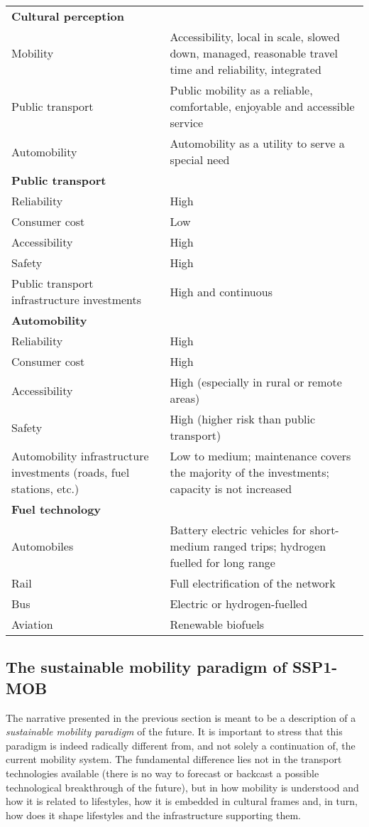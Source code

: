 \begin{table}
\begin{tabular}{p{5cm}p{9cm}}
\textbf{Cultural perception} &  \\
Mobility & Accessibility, local in scale, slowed down, managed, reasonable travel time and reliability, integrated \\
Public transport & Public mobility as a reliable, comfortable, enjoyable and accessible service \\
Automobility & Automobility as a utility to serve a special need \\\addlinespace
\textbf{Public transport} &  \\
Reliability & High \\
Consumer cost & Low \\
Accessibility & High \\
Safety & High \\
Public transport infrastructure investments & High and continuous \\\addlinespace
\textbf{Automobility} &  \\
Reliability & High \\
Consumer cost & High \\
Accessibility & High (especially in rural or remote areas) \\
Safety & High (higher risk than public transport) \\
Automobility infrastructure investments (roads, fuel stations, etc.) & Low to medium; maintenance covers the majority of the investments; capacity is not increased \\\addlinespace
\textbf{Fuel technology} &  \\
Automobiles & Battery electric vehicles for short-medium ranged trips; hydrogen fuelled for long range \\
Rail & Full electrification of the network \\
Bus & Electric or hydrogen-fuelled \\
Aviation & Renewable biofuels \\ \bottomrule
\end{tabular}
\end{table}

\subsection{The sustainable mobility paradigm of SSP1-MOB}
\label{ss:results:ssp1-mob-paradigm}
The narrative presented in the previous section is meant to be a description of a \emph{sustainable mobility paradigm} of the future. It is important to stress that this paradigm is indeed radically different from, and not solely a continuation of, the current mobility system. The fundamental difference lies not in the transport technologies available (there is no way to forecast or backcast a possible technological breakthrough of the future), but in how mobility is understood and how it is related to lifestyles, how it is embedded in cultural frames and, in turn, how does it shape lifestyles and the infrastructure supporting them.

